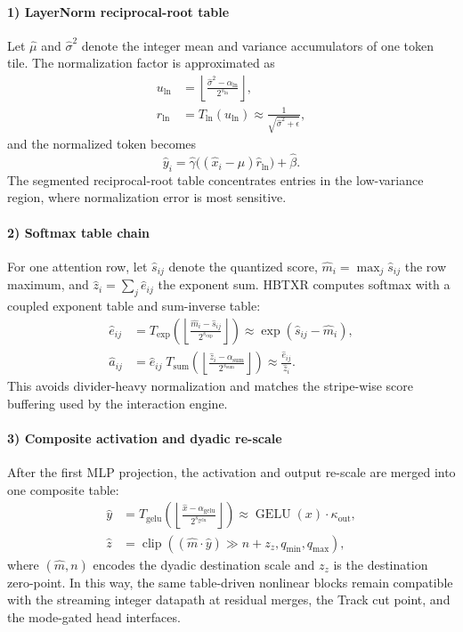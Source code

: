 \documentclass[journal]{IEEEtran}
\begin{document}
\paragraph*{1) LayerNorm reciprocal-root table}
Let $\hat{\mu}$ and $\hat{\sigma}^2$ denote the integer mean and variance accumulators of one token tile. The normalization factor is approximated as
\begin{align}
u_{\mathrm{ln}} &= \left\lfloor \frac{\hat{\sigma}^2-\alpha_{\mathrm{ln}}}{2^{s_{\mathrm{ln}}}} \right\rfloor,\\
\hat r_{\mathrm{ln}} &= T_{\mathrm{ln}}(u_{\mathrm{ln}})
\approx \frac{1}{\sqrt{\hat{\sigma}^2+\epsilon}},
\end{align}
and the normalized token becomes
\begin{equation}
\hat y_i = \hat\gamma \big((\hat x_i-\hat\mu)\hat r_{\mathrm{ln}}\big) + \hat\beta.
\end{equation}
The segmented reciprocal-root table concentrates entries in the low-variance region, where normalization error is most sensitive.

\paragraph*{2) Softmax table chain}
For one attention row, let $\hat s_{ij}$ denote the quantized score, $\hat m_i=\max_j\hat s_{ij}$ the row maximum, and $\hat z_i=\sum_j \hat e_{ij}$ the exponent sum. HBTXR computes softmax with a coupled exponent table and sum-inverse table:
\begin{align}
\hat e_{ij} &=
T_{\exp}\!\left(
\left\lfloor \frac{\hat m_i-\hat s_{ij}}{2^{s_{\exp}}}\right\rfloor
\right)
\approx \exp(\hat s_{ij}-\hat m_i),\\
\hat a_{ij} &= \hat e_{ij}\;
T_{\mathrm{sum}}\!\left(
\left\lfloor \frac{\hat z_i-\alpha_{\mathrm{sum}}}{2^{s_{\mathrm{sum}}}} \right\rfloor
\right)
\approx \frac{\hat e_{ij}}{\hat z_i}.
\end{align}
This avoids divider-heavy normalization and matches the stripe-wise score buffering used by the interaction engine.

\paragraph*{3) Composite activation and dyadic re-scale}
After the first MLP projection, the activation and output re-scale are merged into one composite table:
\begin{align}
\hat y &= T_{\mathrm{gelu}}\!\left(
\left\lfloor \frac{\hat x-\alpha_{\mathrm{gelu}}}{2^{s_{\mathrm{gelu}}}} \right\rfloor
\right)
\approx \operatorname{GELU}(x)\cdot\kappa_{\mathrm{out}},\\
\hat z &= \operatorname{clip}\!\left(\left(\hat m\cdot \hat y\right)\gg n + z_z,
q_{\min},q_{\max}\right),
\end{align}
where $(\hat m,n)$ encodes the dyadic destination scale and $z_z$ is the destination zero-point. In this way, the same table-driven nonlinear blocks remain compatible with the streaming integer datapath at residual merges, the Track cut point, and the mode-gated head interfaces.
\end{document}
